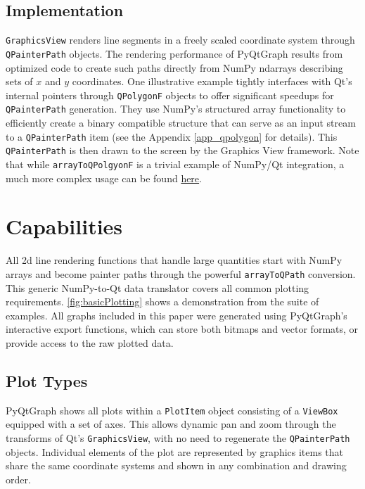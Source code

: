 \subsection{Implementation}
\texttt{GraphicsView} renders line segments in a freely scaled coordinate system through \texttt{QPainterPath} objects. The rendering performance of PyQtGraph results from optimized code to create such paths directly from NumPy ndarrays describing sets of $x$ and $y$ coordinates. One illustrative example tightly interfaces with Qt's internal pointers through \texttt{QPolygonF} objects to offer significant speedups for \texttt{QPainterPath} generation. They use NumPy's structured array functionality to efficiently create a binary compatible structure that can serve as an input stream to a \texttt{QPainterPath} item (see the Appendix \autoref{app_qpolygon} for details). This \texttt{QPainterPath} is then drawn to the screen by the Graphics View framework. Note that while \texttt{arrayToQPolgyonF} is a trivial example of NumPy/Qt integration, a much more complex usage can be found \href{https://github.com/pyqtgraph/pyqtgraph/blob/71bcf3f6d078b07a19b90791d96d27d28cb545d1/pyqtgraph/functions.py#L1967}{here}.

\section{Capabilities}
All 2d line rendering functions that handle large quantities start with NumPy arrays and become painter paths through the powerful \texttt{arrayToQPath} conversion. This generic NumPy-to-Qt data translator covers all common plotting requirements. \autoref{fig:basicPlotting} shows a demonstration from the suite of examples. All graphs included in this paper were generated using PyQtGraph's interactive export functions, which can store both bitmaps and vector formats, or provide access to the raw plotted data.

\subsection{Plot Types}

PyQtGraph shows all plots within a \texttt{PlotItem} object consisting of a \texttt{ViewBox} equipped with a set of axes. This allows dynamic pan and zoom through the transforms of Qt's \texttt{GraphicsView}, with no need to regenerate the \texttt{QPainterPath} objects. Individual elements of the plot are represented by graphics items that share the same coordinate systems and shown in any combination and drawing order. 

